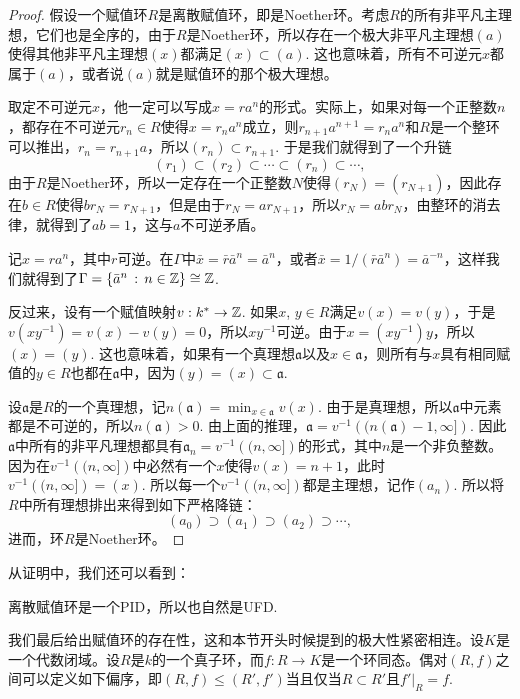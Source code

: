 \begin{proof}
	假设一个赋值环$R$是离散赋值环，即是Noether环。考虑$R$的所有非平凡主理想，它们也是全序的，由于$R$是Noether环，所以存在一个极大非平凡主理想$(a)$使得其他非平凡主理想$(x)$都满足$(x)\subset (a)$. 这也意味着，所有不可逆元$x$都属于$(a)$，或者说$(a)$就是赋值环的那个极大理想。

	取定不可逆元$x$，他一定可以写成$x=ra^n$的形式。实际上，如果对每一个正整数$n$，都存在不可逆元$r_n\in R$使得$x=r_na^n$成立，则$r_{n+1}a^{n+1}=r_n a^n$和$R$是一个整环可以推出，$r_n = r_{n+1}a$，所以$(r_n)\subset r_{n+1}$. 于是我们就得到了一个升链
	\[
	(r_1)\subset (r_2)\subset \cdots \subset (r_n)\subset \cdots,
	\]
	由于$R$是Noether环，所以一定存在一个正整数$N$使得$(r_N)=(r_{N+1})$，因此存在$b\in R$使得$br_N=r_{N+1}$，但是由于$r_N=ar_{N+1}$，所以$r_N=abr_N$，由整环的消去律，就得到了$ab=1$，这与$a$不可逆矛盾。

	记$x=ra^n$，其中$r$可逆。在$\Gamma$中$\bar{x}=\bar{r}\bar{a}^n=\bar{a}^n$，或者$\bar{x}=1/(\bar{r}\bar{a}^n)=\bar{a}^{-n}$，这样我们就得到了$\Gamma=\{\bar{a}^n\,:\, n\in \mathbb{Z}\}\cong \mathbb{Z}$.

	反过来，设有一个赋值映射$v:k^*\to \mathbb{Z}$. 如果$x$, $y\in R$满足$v(x)=v(y)$，于是$v(xy^{-1})=v(x)-v(y)=0$，所以$xy^{-1}$可逆。由于$x=(xy^{-1})y$，所以$(x)=(y)$. 这也意味着，如果有一个真理想$\mathfrak{a}$以及$x\in \mathfrak{a}$，则所有与$x$具有相同赋值的$y\in R$也都在$\mathfrak{a}$中，因为$(y)=(x)\subset \mathfrak{a}$.

	设$\mathfrak{a}$是$R$的一个真理想，记$n(\mathfrak{a})=\min_{x\in \mathfrak{a}}v(x)$. 由于是真理想，所以$\mathfrak{a}$中元素都是不可逆的，所以$n(\mathfrak{a})>0$. 由上面的推理，$\mathfrak{a}=v^{-1}\left((n(\mathfrak{a})-1,\infty]\right)$. 因此$\mathfrak{a}$中所有的非平凡理想都具有$\mathfrak{a}_n=v^{-1}\left((n,\infty]\right)$的形式，其中$n$是一个非负整数。因为在$v^{-1}\left((n,\infty]\right)$中必然有一个$x$使得$v(x)=n+1$，此时$v^{-1}\left((n,\infty]\right)=(x)$. 所以每一个$v^{-1}\left((n,\infty]\right)$都是主理想，记作$(a_n)$. 所以将$R$中所有理想排出来得到如下严格降链：
	\[
		(a_0)\supset (a_1) \supset (a_2)\supset \cdots,
	\]
	进而，环$R$是Noether环。
\end{proof}

从证明中，我们还可以看到：

\begin{pro}
	离散赋值环是一个PID，所以也自然是UFD.
\end{pro}

我们最后给出赋值环的存在性，这和本节开头时候提到的极大性紧密相连。设$K$是一个代数闭域。设$R$是$k$的一个真子环，而$f:R\to K$是一个环同态。偶对$(R,f)$之间可以定义如下偏序，即$(R,f)\leq (R',f')$当且仅当$R\subset R'$且$f'|_R=f$.

